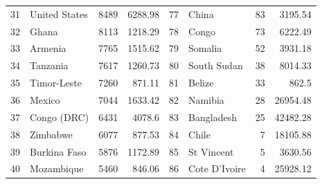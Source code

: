 \begin{longtable}{|c|l|r|r|c|l|r|r|}
	31          & United States         & 8489                               & 6288.98                         & 77          & China                 & 83                                 & 3195.54                         \\
	32          & Ghana                 & 8113                               & 1218.29                         & 78          & Congo                 & 73                                 & 6222.49                         \\
	33          & Armenia               & 7765                               & 1515.62                         & 79          & Somalia               & 52                                 & 3931.18                         \\
	34          & Tanzania              & 7617                               & 1260.73                         & 80          & South Sudan           & 38                                 & 8014.33                         \\
	35          & Timor-Leste           & 7260                               & 871.11                          & 81          & Belize                & 33                                 & 862.5                           \\
	36          & Mexico                & 7044                               & 1633.42                         & 82          & Namibia               & 28                                 & 26954.48                        \\
	37          & Congo (DRC)           & 6431                               & 4078.6                          & 83          & Bangladesh            & 25                                 & 42482.28                        \\
	38          & Zimbabwe              & 6077                               & 877.53                          & 84          & Chile                 & 7                                  & 18105.88                        \\
	39          & Burkina Faso          & 5876                               & 1172.89                         & 85          & St Vincent            & 5                                  & 3630.56                         \\
	40          & Mozambique            & 5460                               & 846.06                          & 86          & Cote D'Ivoire         & 4                                  & 25928.12                        \\

\end{longtable}
